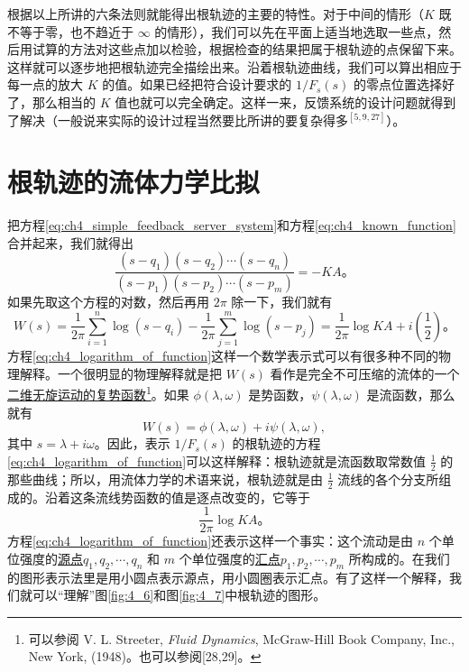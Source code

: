 根据以上所讲的六条法则就能得出根轨迹的主要的特性。对于中间的情形（$K$ 既不等于零，也不趋近于 $\infty$ 的情形），我们可以先在平面上适当地选取一些点，然后用试算的方法对这些点加以检验，根据检查的结果把属于根轨迹的点保留下来。这样就可以逐步地把根轨迹完全描绘出来。沿着根轨迹曲线，我们可以算出相应于每一点的放大 $K$ 的值。如果已经把符合设计要求的 $1/F_s(s)$ 的零点位置选择好了，那么相当的 $K$ 值也就可以完全确定。这样一来，反馈系统的设计问题就得到了解决（一般说来实际的设计过程当然要比所讲的要复杂得多$^{[5,9,27]}$）。

\section{根轨迹的流体力学比拟}


把方程\eqref{eq:ch4_simple_feedback_server_system}和方程\eqref{eq:ch4_known_function}合并起来，我们就得出
\begin{equation*}
\frac{(s-q_1)(s-q_2)\cdots(s-q_n)}{(s-p_1)(s-p_2)\cdots(s-p_m)} = -KA。
\end{equation*}
如果先取这个方程的对数，然后再用 $2\pi$ 除一下，我们就有
\begin{equation}\label{eq:ch4_logarithm_of_function}
W(s) = \frac{1}{2\pi} \sum_{i=1}^n \log(s-q_i) - \frac{1}{2\pi} \sum_{j=1}^m \log(s-p_j) = \frac{1}{2\pi} \log KA + i\left(\frac{1}{2}\right)。
\end{equation}
方程\eqref{eq:ch4_logarithm_of_function}这样一个数学表示式可以有很多种不同的物理解释。一个很明显的物理解释就是把 $W(s)$ 看作是完全不可压缩的流体的一个\underline{二维无旋运动的复势函数}\footnote{可以参阅 V. L. Streeter, \emph{Fluid Dynamics}, McGraw-Hill Book Company, Inc., New York, (1948)。也可以参阅[28,29]。}。如果 $\phi(\lambda,\omega)$ 是势函数，$\psi(\lambda,\omega)$ 是流函数，那么就有
\begin{equation}
W(s) = \phi(\lambda,\omega) + i\psi(\lambda,\omega),
\end{equation}
其中 $s=\lambda+i\omega$。因此，表示 $1/F_s(s)$ 的根轨迹的方程\eqref{eq:ch4_logarithm_of_function}可以这样解释：根轨迹就是流函数取常数值 $\frac{1}{2}$ 的那些曲线；所以，用流体力学的术语来说，根轨迹就是由 $\frac{1}{2}$ 流线的各个分支所组成的。沿着这条流线势函数的值是逐点改变的，它等于
\begin{equation*}
\frac{1}{2\pi} \log KA。
\end{equation*}
方程\eqref{eq:ch4_logarithm_of_function}还表示这样一个事实：这个流动是由 $n$ 个单位强度的\underline{源点}$q_1, q_2, \cdots, q_n$ 和 $m$ 个单位强度的\underline{汇点}$p_1, p_2, \cdots, p_m$ 所构成的。在我们的图形表示法里是用小圆点表示源点，用小圆圈表示汇点。有了这样一个解释，我们就可以“理解”图\ref{fig:4_6}和图\ref{fig:4_7}中根轨迹的图形。

